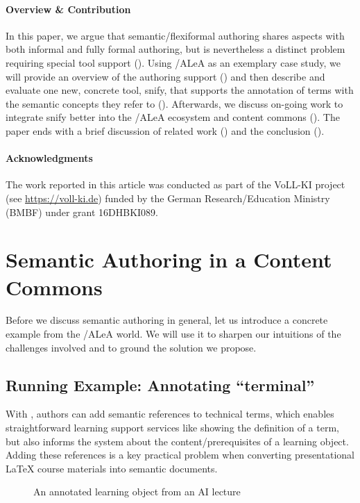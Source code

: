 \documentclass[runningheads]{llncs}
\newcommand\ALeA{\textsf{ALeA}\xspace}
\newcommand\snify{\textsf{snify}\xspace}
\begin{document}
\paragraph{Overview \& Contribution}
In this paper, we argue that semantic/flexiformal authoring shares aspects with both informal and fully formal authoring,
but is nevertheless a distinct problem requiring special tool support ().
Using \sTeX/\ALeA as an exemplary case study,
we will provide an overview of the authoring support ()
and then describe and evaluate one new, concrete tool, \snify, that supports the annotation
of terms with the semantic concepts they refer to ().
Afterwards, we discuss on-going work to integrate \snify better
into the \sTeX/\ALeA ecosystem and content commons ().
The paper ends with a brief discussion of related work () and the conclusion ().


\paragraph{Acknowledgments}
The work reported in this article was conducted as part of the VoLL-KI project (see
\url{https://voll-ki.de}) funded by the German Research/Education Ministry (BMBF) under
grant 16DHBKI089.

\section{Semantic Authoring in a Content Commons}\label{sec:semauth}

Before we discuss semantic authoring in general, let us introduce a concrete example from
the \sTeX/\ALeA world. We will use it to sharpen our intuitions of the challenges
involved and to ground the solution we propose.

\subsection{Running Example: Annotating ``terminal''}
With \sTeX, authors can add semantic references to technical terms,
which enables straightforward learning support services like
showing the definition of a term, but also informs the system
about the content/prerequisites of a learning object.
Adding these references is a key practical problem when converting presentational {\LaTeX}
course materials into semantic documents.

\begin{figure}[ht]\centering
  \caption{An annotated learning object from an AI lecture}\label{fig:lo}
\end{figure}
\end{document}
